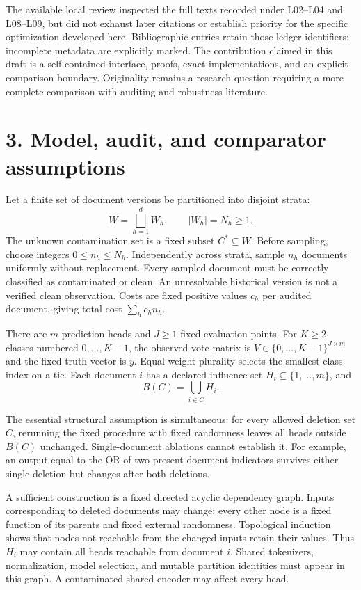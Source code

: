 \documentclass[11pt]{article}
\begin{document}
The available local review inspected the full texts recorded under L02--L04 and L08--L09, but did not exhaust later citations or establish priority for the specific optimization developed here. Bibliographic entries retain those ledger identifiers; incomplete metadata are explicitly marked. The contribution claimed in this draft is a self-contained interface, proofs, exact implementations, and an explicit comparison boundary. Originality remains a research question requiring a more complete comparison with auditing and robustness literature.

\section*{3. Model, audit, and comparator assumptions}

Let a finite set of document versions be partitioned into disjoint strata:
\[
W=\bigsqcup_{h=1}^{d}W_h,\qquad |W_h|=N_h\ge1.
\]
The unknown contamination set is a fixed subset $C^*\subseteq W$. Before sampling, choose integers $0\le n_h\le N_h$. Independently across strata, sample $n_h$ documents uniformly without replacement. Every sampled document must be correctly classified as contaminated or clean. An unresolvable historical version is not a verified clean observation. Costs are fixed positive values $c_h$ per audited document, giving total cost $\sum_h c_hn_h$.

There are $m$ prediction heads and $J\ge1$ fixed evaluation points. For $K\ge2$ classes numbered $0,\ldots,K-1$, the observed vote matrix is $V\in\{0,\ldots,K-1\}^{J\times m}$ and the fixed truth vector is $y$. Equal-weight plurality selects the smallest class index on a tie. Each document $i$ has a declared influence set $H_i\subseteq\{1,\ldots,m\}$, and
\[
B(C)=\bigcup_{i\in C}H_i.
\]

The essential structural assumption is simultaneous: for every allowed deletion set $C$, rerunning the fixed procedure with fixed randomness leaves all heads outside $B(C)$ unchanged. Single-document ablations cannot establish it. For example, an output equal to the OR of two present-document indicators survives either single deletion but changes after both deletions.

A sufficient construction is a fixed directed acyclic dependency graph. Inputs corresponding to deleted documents may change; every other node is a fixed function of its parents and fixed external randomness. Topological induction shows that nodes not reachable from the changed inputs retain their values. Thus $H_i$ may contain all heads reachable from document $i$. Shared tokenizers, normalization, model selection, and mutable partition identities must appear in this graph. A contaminated shared encoder may affect every head.
\end{document}
